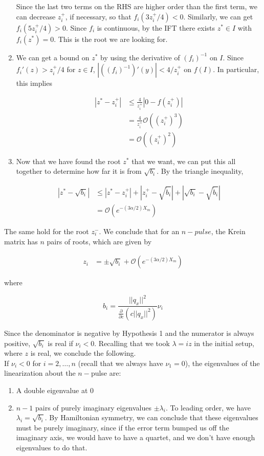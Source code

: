 \documentclass[12pt]{article}
\begin{document}
\begin{enumerate}
Since the last two terms on the RHS are higher order than the first term, we can decrease $z_i^+$, if necessary, so that $f_i(3 z_i^+/4) < 0$. Similarly, we can get $f_i(5 z_i^+/4) > 0$. Since $f_i$ is continuous, by the IFT there exists $z^* \in I$ with $f_i(z^*) = 0$. This is the root we are looking for.

\item We can get a bound on $z^*$ by using the derivative of $(f_i)^{-1}$ on $I$. Since $f_i'(z) > z_i^+/4$ for $z \in I$, $|((f_i)^{-1})'(y)| < 4 / z_i^+$ on $f(I)$. In particular, this implies

\begin{align*}
|z^* - z_i^+| &\leq \frac{4}{z_i^+}|0 - f(z_i^+)| \\
&= \frac{4}{z_i^+}\mathcal{O}((z_i^+)^3) \\
&= \mathcal{O}((z_i^+)^2)
\end{align*}

\item Now that we have found the root $z^*$ that we want, we can put this all together to determine how far it is from $\sqrt{b_i}$. By the triangle inequality,

\begin{align*}
|z^* - \sqrt{b_i}| &\leq |z^* - z_i^+| + |z_i^+ - \sqrt{\tilde{b}_i}| + |\sqrt{b_i} - \sqrt{\tilde{b}_i} | \\
&= \mathcal{O}(e^{-(3 \alpha/2) X_m})
\end{align*}

\end{enumerate}

The same hold for the root $z_i^-$. We conclude that for an $n-pulse$, the Krein matrix has $n$ pairs of roots, which are given by

\begin{align*}
z_i &= \pm \sqrt{b_i} + \mathcal{O}(e^{-(3 \alpha/2) X_m})
\end{align*}

where 

\[
b_i = \frac{||q_x||^2}{\frac{\partial}{\partial c} \left( c||q_x||^2 \right)} \nu_i
\]

Since the denominator is negative by Hypothesis 1 and the numerator is always positive, $\sqrt{b_i}$ is real if $\nu_i < 0$. Recalling that we took $\lambda = i z$ in the initial setup, where $z$ is real, we conclude the following.\\

If $\nu_i < 0$ for $i = 2, \dots, n$ (recall that we always have $\nu_1 = 0$), the eigenvalues of the linearization about the $n-$pulse are:
\begin{enumerate}
	\item A double eigenvalue at 0
	\item $n-1$ pairs of purely imaginary eigenvalues $\pm \lambda_i$. To leading order, we have $\lambda_i = \sqrt{b_i}$. By Hamiltonian symmetry, we can conclude that these eigenvalues must be purely imaginary, since if the error term bumped us off the imaginary axis, we would have to have a quartet, and we don't have enough eigenvalues to do that.
\end{enumerate}
\end{document}
